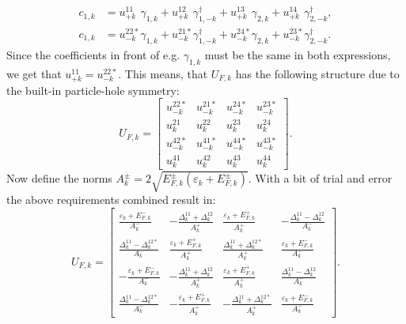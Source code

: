 \begin{align}
c_{1,k} &= u^{11\phantom{*}}_{+k} \gamma_{1,k} + u^{12\phantom{*}}_{+k} \gamma^\dagger_{1,-k} + u^{13\phantom{*}}_{+k} \gamma_{2,k} + u^{14\phantom{*}}_{+k} \gamma^\dagger_{2,-k}, \nonumber \\
c_{1,k} &= u^{22*}_{-k} \gamma_{1,k} + u^{21*}_{-k} \gamma^\dagger_{1,-k} + u^{24*}_{-k} \gamma_{2,k} + u^{23*}_{-k} \gamma^\dagger_{2,-k}. \nonumber
\end{align}
Since the coefficients in front of e.g. $\gamma_{1,k}$ must be the same in both expressions, we get that $u^{11}_{+k} = u^{22*}_{-k}$. This means, that $U_{F,k}$ has the following structure due to the built-in particle-hole symmetry:
\begin{equation}
U_{F,k} = \begin{bmatrix} 
u^{22*}_{-k} & u^{21*}_{-k} & u^{24*}_{-k} & u^{23*}_{-k}           \\  
u^{21}_k 	 & u^{22}_k 	& u^{23}_k 	   & u^{24}_k               \\ 
u^{42*}_{-k} & u^{41*}_{-k} & u^{44*}_{-k} & u^{43*}_{-k}           \\ 
u^{41}_k 	 & u^{42}_k 	& u^{43}_k 	   & u^{44}_k
\end{bmatrix}. \nonumber
\end{equation}
Now define the norms $A^{\pm}_k = 2 \sqrt{ E^{\pm}_{F,k}(\varepsilon_k + E^{\pm}_{F,k}) }$. With a bit of trial and error the above requirements combined result in:
\begin{equation}
U_{F,k} = \begin{bmatrix} 
\frac{\varepsilon_k + E^{-}_{F,k}}{A^{-}_k}    & -\frac{\Delta^{11}_k + \Delta^{12}_k}{A^{+}_k} & \frac{\varepsilon_k + E^{+}_{F,k}}{A^{+}_k}     & -\frac{\Delta^{11}_k - \Delta^{12}_k}{A^{-}_k}  \\  
\frac{\Delta^{11}_k - \Delta^{12*}_k}{A^{-}_k} & \frac{\varepsilon_k + E^{+}_{F,k}}{A^{+}_k}    & \frac{\Delta^{11}_k + \Delta^{12*}_k}{A^{+}_k}  & \frac{\varepsilon_k + E^{-}_{F,k}}{A^{-}_k}     \\ 
-\frac{\varepsilon_k + E^{-}_{F,k}}{A^{-}_k}   & -\frac{\Delta^{11}_k + \Delta^{12}_k}{A^{+}_k} & \frac{\varepsilon_k + E^{+}_{F,k}}{A^{+}_k}     & \frac{\Delta^{11}_k - \Delta^{12}_k}{A^{-}_k} \\ 
\frac{\Delta^{11}_k - \Delta^{12*}_k}{A^{-}_k} & -\frac{\varepsilon_k + E^{+}_{F,k}}{A^{+}_k}   & -\frac{\Delta^{11}_k + \Delta^{12*}_k}{A^{+}_k} & \frac{\varepsilon_k + E^{-}_{F,k}}{A^{-}_k} 
\end{bmatrix}. \nonumber
\end{equation}
